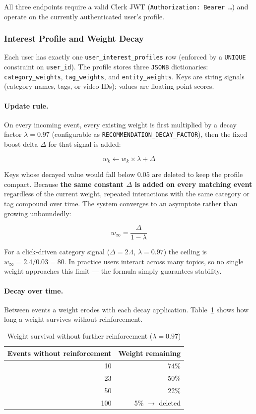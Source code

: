 All three endpoints require a valid Clerk JWT (\texttt{Authorization: Bearer \ldots}) and
operate on the currently authenticated user's profile.

\subsubsection{Interest Profile and Weight Decay}

Each user has exactly one \texttt{user\_interest\_profiles} row (enforced by a
\texttt{UNIQUE} constraint on \texttt{user\_id}). The profile stores three \texttt{JSONB}
dictionaries: \texttt{category\_weights}, \texttt{tag\_weights}, and \texttt{entity\_weights}.
Keys are string signals (category names, tags, or video IDs); values are floating-point scores.

\paragraph{Update rule.}
On every incoming event, every existing weight is first multiplied by a decay factor
$\lambda = 0.97$ (configurable as \texttt{RECOMMENDATION\_DECAY\_FACTOR}), then the fixed
boost delta $\Delta$ for that signal is added:

\[
  w_k \leftarrow w_k \times \lambda + \Delta
\]

Keys whose decayed value would fall below $0.05$ are deleted to keep the profile compact.
Because \textbf{the same constant $\Delta$ is added on every matching event} regardless of
the current weight, repeated interactions with the same category or tag compound over time.
The system converges to an asymptote rather than growing unboundedly:

\[
  w_{\infty} = \frac{\Delta}{1 - \lambda}
\]

For a click-driven category signal ($\Delta = 2.4$, $\lambda = 0.97$) the ceiling is
$w_{\infty} = 2.4 / 0.03 = 80$. In practice users interact across many topics, so no single
weight approaches this limit — the formula simply guarantees stability.

\paragraph{Decay over time.}
Between events a weight erodes with each decay application.
Table~\ref{tab:decay_survival} shows how long a weight survives without reinforcement.

\begin{table}[H]
\centering
\caption{Weight survival without further reinforcement ($\lambda = 0.97$)}
\label{tab:decay_survival}
\begin{tabular}{rr}
\toprule
\textbf{Events without reinforcement} & \textbf{Weight remaining} \\
\midrule
10  & 74\% \\
23  & 50\% \\
50  & 22\% \\
100 & 5\% $\rightarrow$ deleted \\
\bottomrule
\end{tabular}
\end{table}

